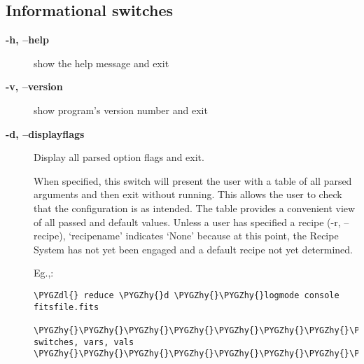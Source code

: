 \documentclass[letterpaper,10pt,english]{sphinxmanual}
\def\PYGZdl{\char`\$}
\def\PYGZhy{\char`\-}
\begin{document}
\subsection{Informational switches}
\label{interfaces:informational-switches}\begin{description}
\item[{\textbf{-h, --help}}] \leavevmode
show the help message and exit

\item[{\textbf{-v, --version}}] \leavevmode
show program's version number and exit

\item[{\textbf{-d, --displayflags}}] \leavevmode
Display all parsed option flags and exit.

When specified, this switch will present the user with a table of all
parsed arguments and then exit without running. This allows the user to
check that the configuration is as intended. The table provides a convenient
view of all passed and default values. Unless a user has specified a
recipe (-r, --recipe), `recipename' indicates `None' because at this point,
the Recipe System has not yet been engaged and a default recipe not yet
determined.

Eg.,:

\begin{Verbatim}[commandchars=\\\{\}]
\PYGZdl{} reduce \PYGZhy{}d \PYGZhy{}\PYGZhy{}logmode console fitsfile.fits

\PYGZhy{}\PYGZhy{}\PYGZhy{}\PYGZhy{}\PYGZhy{}\PYGZhy{}\PYGZhy{}\PYGZhy{}\PYGZhy{}\PYGZhy{}\PYGZhy{}\PYGZhy{}\PYGZhy{}\PYGZhy{}\PYGZhy{}\PYGZhy{}\PYGZhy{}\PYGZhy{}\PYGZhy{}\PYGZhy{}   switches, vars, vals  \PYGZhy{}\PYGZhy{}\PYGZhy{}\PYGZhy{}\PYGZhy{}\PYGZhy{}\PYGZhy{}\PYGZhy{}\PYGZhy{}\PYGZhy{}\PYGZhy{}\PYGZhy{}\PYGZhy{}\PYGZhy{}\PYGZhy{}\PYGZhy{}\PYGZhy{}\PYGZhy{}\PYGZhy{}\PYGZhy{}


\end{Verbatim}
\end{description}
\end{document}
